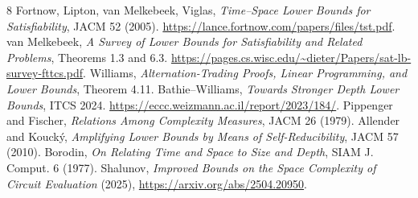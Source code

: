 \documentclass[11pt]{article}
\begin{document}
\begin{thebibliography}{8}
 Fortnow, Lipton, van Melkebeek, Viglas, \emph{Time--Space Lower Bounds for Satisfiability}, JACM 52 (2005). \url{https://lance.fortnow.com/papers/files/tst.pdf}.
 van Melkebeek, \emph{A Survey of Lower Bounds for Satisfiability and Related Problems}, Theorems 1.3 and 6.3. \url{https://pages.cs.wisc.edu/~dieter/Papers/sat-lb-survey-fttcs.pdf}.
 Williams, \emph{Alternation-Trading Proofs, Linear Programming, and Lower Bounds}, Theorem 4.11.
 Bathie--Williams, \emph{Towards Stronger Depth Lower Bounds}, ITCS 2024. \url{https://eccc.weizmann.ac.il/report/2023/184/}.
 Pippenger and Fischer, \emph{Relations Among Complexity Measures}, JACM 26 (1979).
 Allender and Kouck\'y, \emph{Amplifying Lower Bounds by Means of Self-Reducibility}, JACM 57 (2010).
 Borodin, \emph{On Relating Time and Space to Size and Depth}, SIAM J. Comput. 6 (1977).
 Shalunov, \emph{Improved Bounds on the Space Complexity of Circuit Evaluation} (2025), \url{https://arxiv.org/abs/2504.20950}.
\end{thebibliography}
\end{document}
